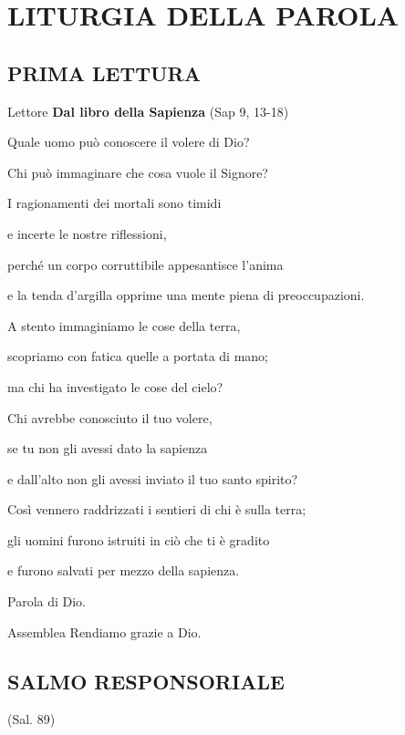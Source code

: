 
\section*{LITURGIA DELLA PAROLA}

\subsection*{PRIMA LETTURA}

\begin{dialoghi}
\item[Lettore] \textbf{Dal libro della Sapienza} (Sap 9, 13-18)

Quale uomo può conoscere il volere di Dio?

Chi può immaginare che cosa vuole il Signore?

I ragionamenti dei mortali sono timidi

e incerte le nostre riflessioni,

perché un corpo corruttibile appesantisce l'anima

e la tenda d'argilla opprime una mente piena di preoccupazioni.

A stento immaginiamo le cose della terra,

scopriamo con fatica quelle a portata di mano;

ma chi ha investigato le cose del cielo?

Chi avrebbe conosciuto il tuo volere,

se tu non gli avessi dato la sapienza

e dall'alto non gli avessi inviato il tuo santo spirito?

Così vennero raddrizzati i sentieri di chi è sulla terra;

gli uomini furono istruiti in ciò che ti è gradito

e furono salvati per mezzo della sapienza.

Parola di Dio.
\item[Assemblea] Rendiamo grazie a Dio.
\end{dialoghi}

\subsection*{SALMO RESPONSORIALE} (Sal. 89)

